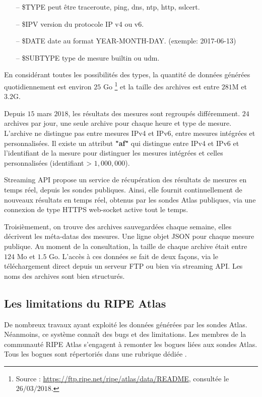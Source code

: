 \begin{itemize}
	\item[--] \$TYPE peut être {traceroute, ping, dns, ntp, http, sslcert}.
	\item[--] \$IPV version du protocole IP v4 ou v6.
	\item[--] \$DATE date au format  YEAR-MONTH-DAY. (exemple: 2017-06-13)
	\item[--] \$SUBTYPE type de mesure builtin ou udm.
\end{itemize}

En considérant toutes les possibilités des types, la quantité de données générées quotidiennement est environ $25$ Go \footnote{Source :  \url{https://ftp.ripe.net/ripe/atlas/data/README}, consultée le $26/03/2018$.}    et la taille des  archives est entre $281$M et $3.2$G.

Depuis $15$ mars $2018$, les résultats des mesures sont  regroupés différemment. $24$ archives par jour,  une seule archive pour chaque heure et  type de mesure. L'archive ne distingue pas entre mesures IPv4 et IPv6,  entre mesures intégrées et  personnalisées. Il existe un attribut \textbf{"af"} qui distingue entre IPv4 et IPv6 et l'identifiant de la mesure pour distinguer les  mesures intégrées et celles personnalisées (identifiant > $1,000,000$). 

Streaming API propose un service de récupération des résultats de mesures en temps réel, depuis les sondes publiques. Ainsi, elle  fournit continuellement de nouveaux résultats en temps réel, obtenus par les sondes  Atlas publiques,  via une connexion de type HTTPS web-socket active tout le temps.

Troisièmement, on trouve des archives sauvegardées chaque semaine, elles décrivent les  méta-datas des mesures. Une ligne objet JSON pour chaque mesure publique. Au moment de la consultation, la taille de chaque archive était entre $124$ Mo et $1.5$ Go. L'accès à ces   données se fait de deux façons, via le téléchargement direct depuis un serveur  FTP ou bien via streaming API. Les noms des archives sont bien structurés.



\subsection{Les limitations du RIPE Atlas}


De nombreux travaux ayant exploité les données générées par les sondes Atlas. Néanmoins, ce système connaît des bugs et des limitations. Les membres de la communauté RIPE Atlas s'engagent à remonter les bogues liées aux sondes Atlas. Tous les bogues sont répertoriés dans une rubrique dédiée  \cite{bugs-ripe-atlas}.


